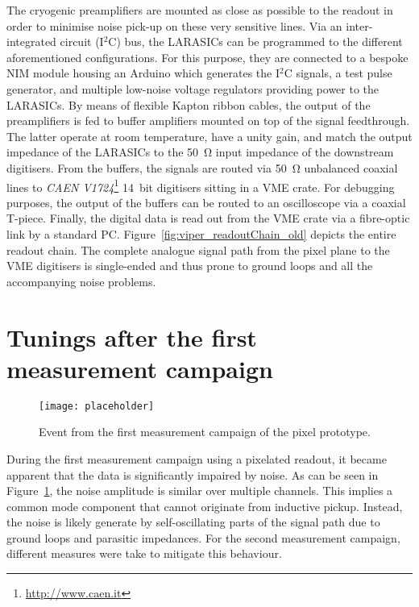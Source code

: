 The cryogenic preamplifiers are mounted as close as possible to the readout in order to minimise noise pick-up on these very sensitive lines.
Via an inter-integrated circuit (I$^2$C) bus, the LARASICs can be programmed to the different aforementioned configurations.
For this purpose, they are connected to a bespoke NIM module housing an Arduino which generates the I$^2$C signals, a test pulse generator, and multiple low-noise voltage regulators providing power to the LARASICs.
By means of flexible Kapton ribbon cables, the output of the preamplifiers is fed to buffer amplifiers mounted on top of the signal feedthrough.
The latter operate at room temperature, have a unity gain, and match the output impedance of the LARASICs to the \SI{50}{\ohm} input impedance of the downstream digitisers.
From the buffers, the signals are routed via \SI{50}{\ohm} unbalanced coaxial lines to \emph{CAEN V1724}\footnote{\href{http://www.caen.it}{http://www.caen.it}} \SI{14}{bit} digitisers sitting in a VME crate.
For debugging purposes, the output of the buffers can be routed to an oscilloscope via a coaxial T-piece.
Finally, the digital data is read out from the VME crate via a fibre-optic link by a standard PC.
Figure~\ref{fig:viper_readoutChain_old} depicts the entire readout chain.
The complete analogue signal path from the pixel plane to the VME digitisers is single-ended and thus prone to ground loops and all the accompanying noise problems.


\section{Tunings after the first measurement campaign\label{sec:electronics_tuning}}

\begin{figure}[htb] %
	\centering
	\texttt{[image: placeholder]}
	\caption{Event from the first measurement campaign of the pixel prototype.}
	\label{fig:viper_noisy-event}
\end{figure}

During the first measurement campaign using a pixelated readout, it became apparent that the data is significantly impaired by noise.
As can be seen in Figure~\ref{fig:viper_noisy-event}, the noise amplitude is similar over multiple channels.
This implies a common mode component that cannot originate from inductive pickup.
Instead, the noise is likely generate by self-oscillating parts of the signal path due to ground loops and parasitic impedances.
For the second measurement campaign, different measures were take to mitigate this behaviour.

